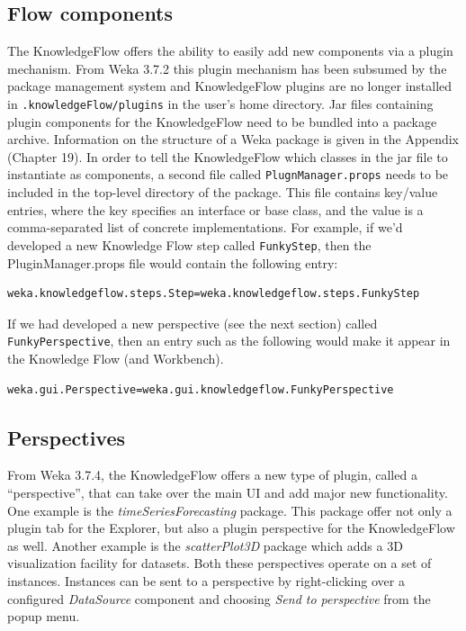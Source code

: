 \subsection{Flow components}
The KnowledgeFlow offers the ability to easily add new components via
a plugin mechanism. From Weka 3.7.2 this plugin mechanism has been
subsumed by the package management system and KnowledgeFlow plugins
are no longer installed in \verb=.knowledgeFlow/plugins= in the user's
home directory. Jar files containing plugin components for the
KnowledgeFlow need to be bundled into a package archive. Information
on the structure of a Weka package is given in the Appendix (Chapter
19). In order to tell the KnowledgeFlow which classes in the jar file
to instantiate as components, a second file called
\verb=PlugnManager.props= needs to be included in the top-level
directory of the package. This file contains key/value entries, where
the key specifies an interface or base class, and the value is a
comma-separated list of concrete implementations.  For example, if
we'd developed a new Knowledge Flow step called \verb=FunkyStep=, then
the PluginManager.props file would contain the following entry:

\begin{verbatim}
weka.knowledgeflow.steps.Step=weka.knowledgeflow.steps.FunkyStep
\end{verbatim}

If we had developed a new perspective (see the next section) called
\verb=FunkyPerspective=, then an entry such as the following would
make it appear in the Knowledge Flow (and Workbench).

\begin{verbatim}
weka.gui.Perspective=weka.gui.knowledgeflow.FunkyPerspective
\end{verbatim}


\subsection{Perspectives}
From Weka 3.7.4, the KnowledgeFlow offers a new type of plugin, called
a ``perspective'', that can take over the main UI and add major new
functionality. One example is the \textit{timeSeriesForecasting}
package. This package offer not only a plugin tab for the Explorer,
but also a plugin perspective for the KnowledgeFlow as well. Another
example is the \textit{scatterPlot3D} package which adds a 3D
visualization facility for datasets. Both these perspectives operate
on a set of instances. Instances can be sent to a perspective by
right-clicking over a configured \textit{DataSource} component and
choosing \textit{Send to perspective} from the popup menu.

